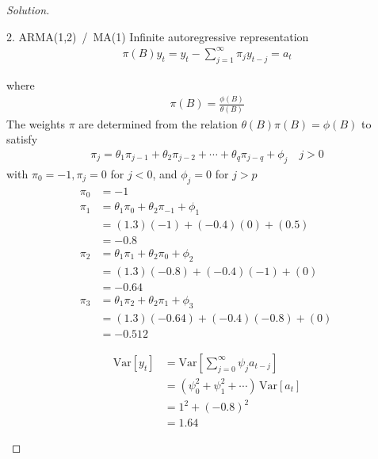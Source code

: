 \documentclass[UTF8,a4paper,14pt]{ctexart}
\newcommand{\Var}{\mathrm{Var}}
\newenvironment{solution}
  {\renewcommand\qedsymbol{$\blacksquare$}\begin{proof}[Solution]}
  {\end{proof}}
\theoremstyle{definition}
\theoremstyle{remark}
\begin{document}
\begin{solution}
\begin{mybox}{2. ARMA(1,2) \,/\, MA(1)}
    Infinite autoregressive representation
    \begin{equation}\
      \begin{aligned}
        \pi(B)y_t = y_t -\sum_{j=1}^{\infty} \pi_j y_{t-j} =a_t
      \end{aligned}
    \end{equation}

    where
      \begin{equation}\
        \begin{aligned}
        \pi(B) = \frac{\phi(B)}{\theta(B)}
        \end{aligned}
      \end{equation}
      The weights \(\pi\) are determined from the relation \(\theta(B)\pi(B)= \phi(B)\) to satisfy
      \begin{equation}\
        \begin{aligned}
        \pi_j = \theta_1\pi_{j-1}+\theta_2\pi_{j-2}+\cdots+\theta_q\pi_{j-q}+\phi_j\quad j>0
        \end{aligned}
      \end{equation}
      with \(\pi_0 = -1, \pi_j = 0\) for \(j<0\), and \(\phi_j = 0\) for \(j>p\)
      \begin{equation}
        \begin{aligned}
        \pi_0 &= -1\\
        \pi_1 &= \theta_1\pi_{0}+\theta_2\pi_{-1}+\phi_1\\
        &=(1.3)(-1)+(-0.4)(0)+(0.5)\\
        &=-0.8\\
        \pi_2 &= \theta_1\pi_{1}+\theta_2\pi_{0}+\phi_2\\
        &=(1.3)(-0.8)+(-0.4)(-1)+(0)\\
        &=-0.64\\
        \pi_3 &= \theta_1\pi_{2}+\theta_2\pi_{1}+\phi_3\\
        &=(1.3)(-0.64)+(-0.4)(-0.8)+(0)\\
        & = -0.512
        \end{aligned}
      \end{equation}

      \begin{equation}\
        \begin{aligned}
          \Var[y_t] &= \Var[\sum_{j = 0}^{\infty} \psi_j a_{t-j} ]\\
          &=(\psi_0^2+\psi_1^2+\cdots)\,\Var[ a_{t} ]\\
          &=1^2+(-0.8)^2\\
          &=1.64
        \end{aligned}
      \end{equation}


\end{mybox}
\end{solution}
\end{document}
